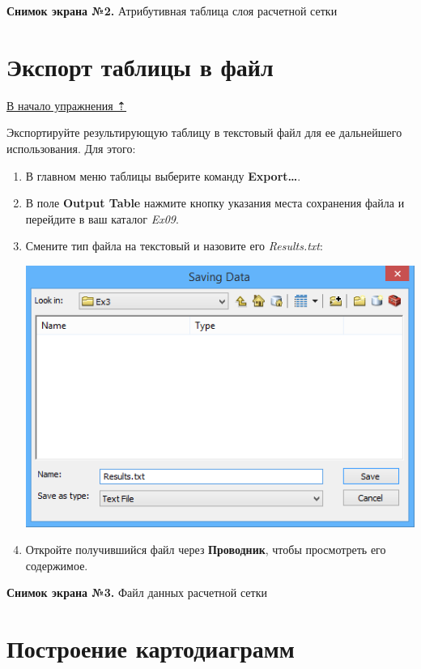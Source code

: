 \documentclass[]{book}
\theoremstyle{definition}
\theoremstyle{definition}
\theoremstyle{definition}
\theoremstyle{remark}
\begin{document}
\textbf{Снимок экрана №2.} Атрибутивная таблица слоя расчетной сетки

\hypertarget{land-cover-hydro-export}{%
\section{Экспорт таблицы в файл}\label{land-cover-hydro-export}}

\protect\hyperlink{land-cover-hydro}{В начало упражнения ⇡}

Экспортируйте результирующую таблицу в текстовый файл для ее дальнейшего
использования. Для этого:

\begin{enumerate}
\def\labelenumi{\arabic{enumi}.}
\item
  В главном меню таблицы выберите команду \textbf{Export\ldots{}}.
\item
  В поле \textbf{Output Table} нажмите кнопку указания места сохранения
  файла и перейдите в ваш каталог \emph{Ex09}.
\item
  Смените тип файла на текстовый и назовите его \emph{Results.txt}:

  \includegraphics{images/Ex09/image14.png}
\item
  Откройте получившийся файл через \textbf{Проводник}, чтобы просмотреть
  его содержимое.
\end{enumerate}

\textbf{Снимок экрана №3.} Файл данных расчетной сетки

\hypertarget{land-cover-hydro-diagrams}{%
\section{Построение картодиаграмм}\label{land-cover-hydro-diagrams}}
\end{document}
